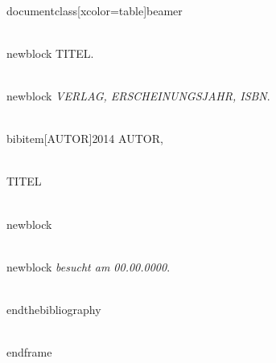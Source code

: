 \\documentclass[xcolor=table]{beamer}
\begin{document}
            \\newblock TITEL.

            \\newblock {\em VERLAG, ERSCHEINUNGSJAHR, ISBN}.


        \\bibitem[AUTOR]{2014}
            AUTOR,

            \\TITEL

            \\newblock {}

            \\newblock {\em besucht am 00.00.0000}.


    \\end{thebibliography}

\\end{frame}

\
\end{document}
